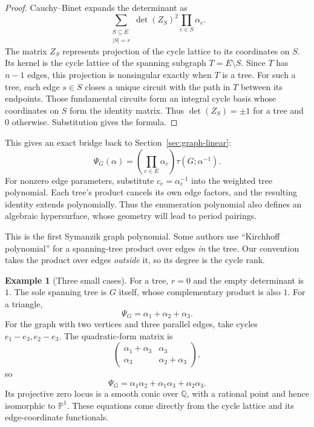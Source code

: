 \documentclass[11pt]{article}
\theoremstyle{definition}
\newtheorem{example}[theorem]{Example}
\theoremstyle{remark}
\newcommand{\Q}{\mathbb Q}
\begin{document}
\begin{proof}
Cauchy--Binet expands the determinant as
\[
  \sum_{\substack{S\subseteq E\\|S|=r}}
       \det(Z_S)^2\prod_{e\in S}\alpha_e.
\]
The matrix $Z_S$ represents projection of the cycle lattice to its
coordinates on $S$.  Its kernel is the cycle lattice of the spanning
subgraph $T=E\setminus S$.  Since $T$ has $n-1$ edges, this projection
is nonsingular exactly when $T$ is a tree.  For such a tree, each edge
$s\in S$ closes a unique circuit with the path in $T$ between its
endpoints.  Those fundamental circuits form an integral cycle basis
whose coordinates on $S$ form the identity matrix.  Thus
$\det(Z_S)=\pm1$ for a tree and $0$ otherwise.  Substitution gives the
formula.
\end{proof}

This gives an exact bridge back to Section~\ref{sec:graph-linear}:
\[
 \Psi_G(\alpha)=\left(\prod_{e\in E}\alpha_e\right)
                  \tau(G;\alpha^{-1}).
\]
For nonzero edge parameters, substitute $c_e=\alpha_e^{-1}$ into the weighted tree polynomial. Each tree's product cancels its own edge factors, and the resulting identity extends polynomially. Thus the enumeration polynomial also defines an algebraic hypersurface, whose geometry will lead to period pairings.

This is the first Symanzik graph polynomial.  Some authors use
``Kirchhoff polynomial'' for a spanning-tree product over edges
\emph{in} the tree.  Our convention takes the product over edges
\emph{outside} it, so its degree is the cycle rank.

\begin{example}[Three small cases]
For a tree, $r=0$ and the empty determinant is $1$.  The sole spanning
tree is $G$ itself, whose complementary product is also $1$.
For a triangle,
\[
  \Psi_G=\alpha_1+\alpha_2+\alpha_3.
\]
For the graph with two vertices and three parallel edges, take cycles
$e_1-e_3,e_2-e_3$.  The quadratic-form matrix is
\[
  \begin{pmatrix}\alpha_1+\alpha_3&\alpha_3\\
                  \alpha_3&\alpha_2+\alpha_3\end{pmatrix},
\]
so
\[
  \Psi_G=\alpha_1\alpha_2+\alpha_1\alpha_3+\alpha_2\alpha_3.
\]
Its projective zero locus is a smooth conic over $\Q$, with a rational
point and hence isomorphic to $\mathbb P^1$.  These equations come
directly from the cycle lattice and its edge-coordinate functionals.
\end{example}
\end{document}
